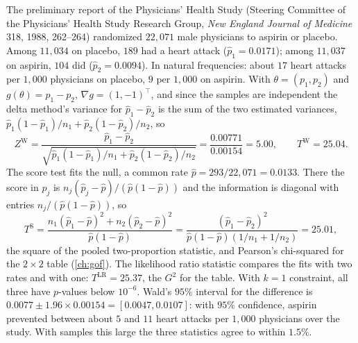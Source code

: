 \begin{worked}
The preliminary report of the Physicians' Health Study (Steering Committee of the Physicians' Health Study Research Group, \textit{New England Journal of Medicine} 318, 1988, 262--264) randomized $22{,}071$ male physicians to aspirin or placebo.
Among $11{,}034$ on placebo, $189$ had a heart attack ($\hat{p}_1 = 0.0171$); among $11{,}037$ on aspirin, $104$ did ($\hat{p}_2 = 0.0094$).
In natural frequencies: about $17$ heart attacks per $1{,}000$ physicians on placebo, $9$ per $1{,}000$ on aspirin.
With $\theta = (p_1, p_2)$ and $g(\theta) = p_1 - p_2$, $\nabla g = (1, -1)^\top$, and since the samples are independent the delta method's variance for $\hat{p}_1 - \hat{p}_2$ is the sum of the two estimated variances, $\hat{p}_1(1 - \hat{p}_1)/n_1 + \hat{p}_2(1 - \hat{p}_2)/n_2$, so
\[
Z^{\mathrm{W}} = \frac{\hat{p}_1 - \hat{p}_2}{\sqrt{\hat{p}_1(1 - \hat{p}_1)/n_1 + \hat{p}_2(1 - \hat{p}_2)/n_2}} = \frac{0.00771}{0.00154} = 5.00, \qquad T^{\mathrm{W}} = 25.04.
\]
The score test fits the null, a common rate $\hat{p} = 293/22{,}071 = 0.0133$.
There the score in $p_j$ is $n_j(\hat{p}_j - \hat{p})/(\hat{p}(1 - \hat{p}))$ and the information is diagonal with entries $n_j/(\hat{p}(1 - \hat{p}))$, so
\[
T^{\mathrm{S}} = \frac{n_1(\hat{p}_1 - \hat{p})^2 + n_2(\hat{p}_2 - \hat{p})^2}{\hat{p}(1 - \hat{p})} = \frac{(\hat{p}_1 - \hat{p}_2)^2}{\hat{p}(1 - \hat{p})(1/n_1 + 1/n_2)} = 25.01,
\]
the square of the pooled two-proportion statistic, and Pearson's chi-squared for the $2 \times 2$ table (\cref{ch:gof}).
The likelihood ratio statistic compares the fits with two rates and with one: $T^{\mathrm{LR}} = 25.37$, the $G^2$ for the table.
With $k = 1$ constraint, all three have $p$-values below $10^{-6}$.
Wald's $95\%$ interval for the difference is $0.0077 \pm 1.96 \times 0.00154 = [0.0047, 0.0107]$: with $95\%$ confidence, aspirin prevented between about $5$ and $11$ heart attacks per $1{,}000$ physicians over the study.
With samples this large the three statistics agree to within $1.5\%$.
\end{worked}

